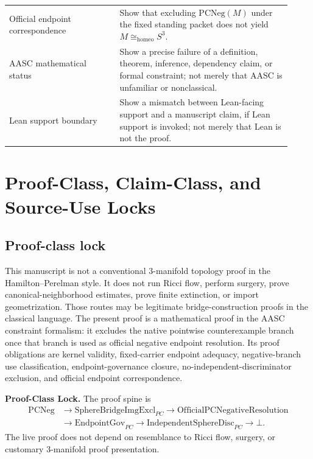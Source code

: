\documentclass[11pt]{article}
\newcommand{\Sthree}{S^{3}}
\newcommand{\OfficialPCNegativeResolution}{\mathrm{OfficialPCNegativeResolution}}
\newcommand{\PCNeg}{\mathrm{PCNeg}}
\newcommand{\SphereBridgeImgExcl}{\mathrm{SphereBridgeImgExcl}_{PC}}
\newcommand{\EndpointGov}{\mathrm{EndpointGov}_{PC}}
\newcommand{\IndependentSphereDisc}{\mathrm{IndependentSphereDisc}_{PC}}
\newcommand{\Homeo}{\cong_{\mathrm{homeo}}}
\begin{document}
\begin{longtable}{L{0.36\linewidth}L{0.56\linewidth}}
Official endpoint correspondence & Show that excluding \(\PCNeg(M)\) under the fixed standing packet does not yield \(M\Homeo\Sthree\).\\
AASC mathematical status & Show a precise failure of a definition, theorem, inference, dependency claim, or formal constraint; not merely that AASC is unfamiliar or nonclassical.\\
Lean support boundary & Show a mismatch between Lean-facing support and a manuscript claim, if Lean support is invoked; not merely that Lean is not the proof.\\
\bottomrule
\end{longtable}

\tableofcontents
\newpage
{}

\section{Proof-Class, Claim-Class, and Source-Use Locks}

\subsection{Proof-class lock}
This manuscript is not a conventional 3-manifold topology proof in the Hamilton--Perelman style. It does not run Ricci flow, perform surgery, prove canonical-neighborhood estimates, prove finite extinction, or import geometrization. Those routes may be legitimate bridge-construction proofs in the classical language. The present proof is a mathematical proof in the AASC constraint formalism: it excludes the native pointwise counterexample branch once that branch is used as official negative endpoint resolution. Its proof obligations are kernel validity, fixed-carrier endpoint adequacy, negative-branch use classification, endpoint-governance closure, no-independent-discriminator exclusion, and official endpoint correspondence.

\begin{mdframed}[backgroundcolor=gray!8,linewidth=0.6pt]
\textbf{Proof-Class Lock.} The proof spine is
\[
\begin{aligned}
\PCNeg&\to\SphereBridgeImgExcl\to\OfficialPCNegativeResolution\\
&\to\EndpointGov\to\IndependentSphereDisc\to\bot.
\end{aligned}
\]
The live proof does not depend on resemblance to Ricci flow, surgery, or customary 3-manifold proof presentation.
\end{mdframed}
\end{document}
